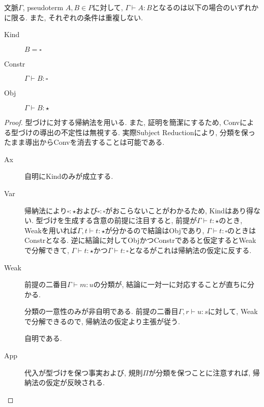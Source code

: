 \documentclass[12pt]{ltjsarticle}
\begin{document}
\begin{lem}[Classification]\label{clsfy}
 文脈$\Gamma$, pseudoterm $A, B \in P$に対して, $\Gamma \vdash A \colon B$となるのは以下の場合のいずれかに限る. また, それぞれの条件は重複しない.
 \begin{description}
  \item[Kind] $B = \square$
  \item[Constr] $\Gamma \vdash B {\colon} {\square}$
  \item[Obj] $\Gamma \vdash B {\colon} {\star}$
 \end{description}
\end{lem}
\begin{proof}
 型づけに対する帰納法を用いる. また, 証明を簡潔にするため, Convによる型づけの導出の不定性は無視する. 実際Subject Reductionにより, 分類を保ったまま導出からConvを消去することは可能である.
 \begin{description}
  \item[Ax] 自明にKindのみが成立する.
  \item[Var] 帰納法により$\square \colon \star$および$\square \colon \square$がおこらないことがわかるため, Kindはあり得ない. 型づけを生成する含意の前提に注目すると, 前提が$\Gamma \vdash t {\colon} {\star}$のとき, Weakを用いれば$\Gamma, t \vdash t {\colon} {\star}$が分かるので結論はObjであり, $\Gamma \vdash t {\colon} {\square}$のときはConstrとなる. 逆に結論に対してObjかつConstrであると仮定するとWeakで分解できて, $\Gamma \vdash t {\colon} {\star}$かつ$\Gamma \vdash t {\colon} {\square}$となるがこれは帰納法の仮定に反する.
  \item[Weak] 前提の二番目$\Gamma \vdash m {\colon} u$の分類が, 結論に一対一に対応することが直ちに分かる.
  \item[\Pi] 分類の一意性のみが非自明である. 前提の二番目$\Gamma, r \vdash u {\colon} s$に対して, Weakで分解できるので, 帰納法の仮定より主張が従う.
  \item[\lambda] 自明である.
  \item[App] 代入が型づけを保つ事実および, 規則$\Pi$が分類を保つことに注意すれば, 帰納法の仮定が反映される.
 \end{description}
\end{proof}
\end{document}
